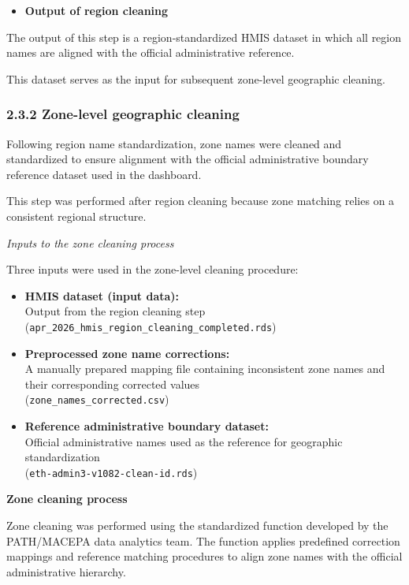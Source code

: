 \documentclass[
  letterpaper,
  DIV=11,
  numbers=noendperiod]{scrartcl}
\providecommand{\tightlist}{%
  \setlength{\itemsep}{0pt}\setlength{\parskip}{0pt}}
\begin{document}
\begin{itemize}
\tightlist
\item
  \textbf{Output of region cleaning}
\end{itemize}

The output of this step is a region-standardized HMIS dataset in which
all region names are aligned with the official administrative reference.

This dataset serves as the input for subsequent zone-level geographic
cleaning.

\subsubsection{2.3.2 Zone-level geographic
cleaning}\label{zone-level-geographic-cleaning}

Following region name standardization, zone names were cleaned and
standardized to ensure alignment with the official administrative
boundary reference dataset used in the dashboard.

This step was performed after region cleaning because zone matching
relies on a consistent regional structure.

\emph{Inputs to the zone cleaning process}

Three inputs were used in the zone-level cleaning procedure:

\begin{itemize}
\item
  \textbf{HMIS dataset (input data):}\\
  Output from the region cleaning step\\
  (\texttt{apr\_2026\_hmis\_region\_cleaning\_completed.rds})
\item
  \textbf{Preprocessed zone name corrections:}\\
  A manually prepared mapping file containing inconsistent zone names
  and their corresponding corrected values\\
  (\texttt{zone\_names\_corrected.csv})
\item
  \textbf{Reference administrative boundary dataset:}\\
  Official administrative names used as the reference for geographic
  standardization\\
  (\texttt{eth-admin3-v1082-clean-id.rds})
\end{itemize}

\textbf{Zone cleaning process}

Zone cleaning was performed using the standardized function developed by
the PATH/MACEPA data analytics team. The function applies predefined
correction mappings and reference matching procedures to align zone
names with the official administrative hierarchy.
\end{document}
